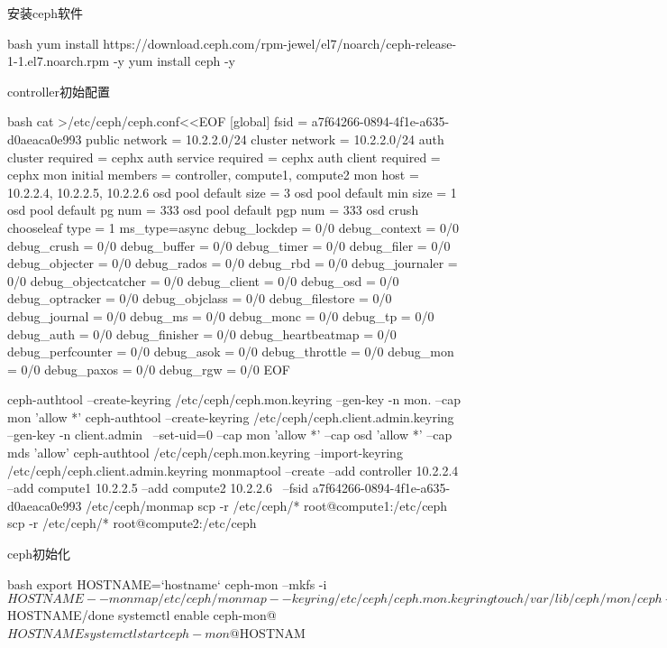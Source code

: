 \begin{outline}[enumerate]

\1 安装ceph软件
\begin{code-in-enumerate}{bash}
yum install https://download.ceph.com/rpm-jewel/el7/noarch/ceph-release-1-1.el7.noarch.rpm -y
yum install ceph -y
\end{code-in-enumerate}

\1 controller初始配置
\begin{code-in-enumerate}{bash}
cat >/etc/ceph/ceph.conf<<EOF
[global]
fsid = a7f64266-0894-4f1e-a635-d0aeaca0e993
public network = 10.2.2.0/24
cluster network = 10.2.2.0/24
auth cluster required = cephx
auth service required = cephx
auth client required = cephx
mon initial members = controller, compute1, compute2
mon host = 10.2.2.4, 10.2.2.5, 10.2.2.6
osd pool default size = 3
osd pool default min size = 1
osd pool default pg num = 333
osd pool default pgp num = 333
osd crush chooseleaf type = 1
ms_type=async
debug_lockdep = 0/0
debug_context = 0/0
debug_crush = 0/0
debug_buffer = 0/0
debug_timer = 0/0
debug_filer = 0/0
debug_objecter = 0/0
debug_rados = 0/0
debug_rbd = 0/0
debug_journaler = 0/0
debug_objectcatcher = 0/0
debug_client = 0/0
debug_osd = 0/0
debug_optracker = 0/0
debug_objclass = 0/0
debug_filestore = 0/0
debug_journal = 0/0
debug_ms = 0/0
debug_monc = 0/0
debug_tp = 0/0
debug_auth = 0/0
debug_finisher = 0/0
debug_heartbeatmap = 0/0
debug_perfcounter = 0/0
debug_asok = 0/0
debug_throttle = 0/0
debug_mon = 0/0
debug_paxos = 0/0
debug_rgw = 0/0
EOF

ceph-authtool --create-keyring /etc/ceph/ceph.mon.keyring --gen-key -n mon. --cap mon 'allow *'
ceph-authtool --create-keyring /etc/ceph/ceph.client.admin.keyring --gen-key -n client.admin \
    --set-uid=0 --cap mon 'allow *' --cap osd 'allow *' --cap mds 'allow'
ceph-authtool /etc/ceph/ceph.mon.keyring --import-keyring /etc/ceph/ceph.client.admin.keyring
monmaptool --create --add controller 10.2.2.4 --add compute1 10.2.2.5 --add compute2 10.2.2.6 \
    --fsid a7f64266-0894-4f1e-a635-d0aeaca0e993 /etc/ceph/monmap
scp -r /etc/ceph/* root@compute1:/etc/ceph
scp -r /etc/ceph/* root@compute2:/etc/ceph
\end{code-in-enumerate}

\1 ceph初始化
\begin{code-in-enumerate}{bash}
export HOSTNAME=`hostname`
ceph-mon --mkfs -i $HOSTNAME --monmap /etc/ceph/monmap --keyring /etc/ceph/ceph.mon.keyring
touch /var/lib/ceph/mon/ceph-$HOSTNAME/done
systemctl enable ceph-mon@$HOSTNAME
systemctl start ceph-mon@$HOSTNAM


\end{code-in-enumerate}
\end{outline}
